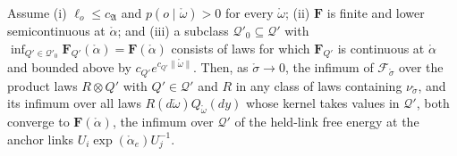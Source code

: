 \begin{theorem}\label{thm:llp_held_limit}
Assume (i) $\ell_o\leq c_{\mathfrak A}$ and $p(o\mid\mathring\omega)>0$ for every $\mathring\omega$; (ii) $\mathbf F$ is finite and lower semicontinuous at $\mathring\alpha$; and (iii) a subclass $\mathcal Q'_0\subseteq\mathcal Q'$ with $\inf_{Q'\in\mathcal Q'_0}\mathbf F_{Q'}(\mathring\alpha)=\mathbf F(\mathring\alpha)$ consists of laws for which $\mathbf F_{Q'}$ is continuous at $\mathring\alpha$ and bounded above by $c_{Q'}e^{c_{Q'}\|\mathring\omega\|}$. Then, as $\mathring\sigma\to0$, the infimum of $\mathcal F_{\mathring\sigma}$ over the product laws $R\otimes Q'$ with $Q'\in\mathcal Q'$ and $R$ in any class of laws containing $\nu_{\mathring\sigma}$, and its infimum over all laws $R(d\mathring\omega)Q_{\mathring\omega}(dy)$ whose kernel takes values in $\mathcal Q'$, both converge to $\mathbf F(\mathring\alpha)$, the infimum over $\mathcal Q'$ of the held-link free energy at the anchor links $U_i\exp(\mathring\alpha_e)U_j^{-1}$.
\end{theorem}

